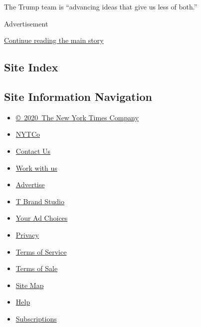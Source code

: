 The Trump team is ``advancing ideas that give us less of both.''

Advertisement

\protect\hyperlink{after-bottom}{Continue reading the main story}

\hypertarget{site-index}{%
\subsection{Site Index}\label{site-index}}

\hypertarget{site-information-navigation}{%
\subsection{Site Information
Navigation}\label{site-information-navigation}}

\begin{itemize}
\tightlist
\item
  \href{https://help.nytimes.com/hc/en-us/articles/115014792127-Copyright-notice}{©~2020~The
  New York Times Company}
\end{itemize}

\begin{itemize}
\tightlist
\item
  \href{https://www.nytco.com/}{NYTCo}
\item
  \href{https://help.nytimes.com/hc/en-us/articles/115015385887-Contact-Us}{Contact
  Us}
\item
  \href{https://www.nytco.com/careers/}{Work with us}
\item
  \href{https://nytmediakit.com/}{Advertise}
\item
  \href{http://www.tbrandstudio.com/}{T Brand Studio}
\item
  \href{https://www.nytimes.com/privacy/cookie-policy\#how-do-i-manage-trackers}{Your
  Ad Choices}
\item
  \href{https://www.nytimes.com/privacy}{Privacy}
\item
  \href{https://help.nytimes.com/hc/en-us/articles/115014893428-Terms-of-service}{Terms
  of Service}
\item
  \href{https://help.nytimes.com/hc/en-us/articles/115014893968-Terms-of-sale}{Terms
  of Sale}
\item
  \href{https://spiderbites.nytimes.com}{Site Map}
\item
  \href{https://help.nytimes.com/hc/en-us}{Help}
\item
  \href{https://www.nytimes.com/subscription?campaignId=37WXW}{Subscriptions}
\end{itemize}
